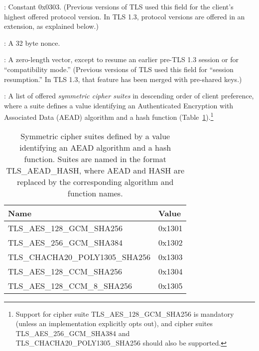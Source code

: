 \begin{description}

\item \TLSlegacyVersion: Constant 0x0303.
%
%
(Previous versions of TLS used this field for the client's highest offered 
  protocol version. In TLS 1.3, protocol versions are offered in an 
  extension, as explained below.)

\item \TLSrandom: A 32 byte nonce.

\item \TLSlegacySessionId: A zero-length vector, except to 
  resume an earlier pre-TLS 1.3 session or for ``compatibility 
  mode.'' (Previous versions of TLS used this field for 
  ``session resumption.'' In TLS 1.3, that feature has been 
  merged with pre-shared keys.)

\item \TLScipherSuites: A list of offered \emph{symmetric cipher suites} in
  descending order of client preference, where a suite defines a value identifying an Authenticated Encryption 
  with Associated Data (AEAD) algorithm and a hash function (Table~\ref{table:suites}).\footnote{
    Support for cipher suite TLS\_AES\_128\_GCM\_SHA256 is mandatory (unless an implementation 
    explicitly opts out), and cipher suites TLS\_AES\_256\_GCM\_SHA384 and 
    TLS\_CHACHA20\_POLY1305\_SHA256 should also be supported.
  }


\begin{table}[tbp]
\caption{Symmetric cipher suites defined by a value identifying
  an AEAD algorithm and a hash function. Suites are named in the 
  format TLS\_AEAD\_HASH, where AEAD and HASH are replaced by the 
  corresponding algorithm and function names.}
\label{table:suites}

\centering

\begin{tabular}{l|l}
  Name                             & Value  \\ \hline
  TLS\_AES\_128\_GCM\_SHA256       & 0x1301 \\
  TLS\_AES\_256\_GCM\_SHA384       & 0x1302 \\
  TLS\_CHACHA20\_POLY1305\_SHA256  & 0x1303 \\
  TLS\_AES\_128\_CCM\_SHA256       & 0x1304\\
  TLS\_AES\_128\_CCM\_8\_SHA256    & 0x1305
\end{tabular}
\end{table}


\end{description}
